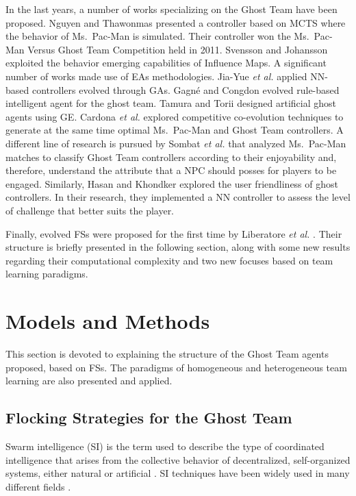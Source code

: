 \documentclass[journal]{IEEEtran}
\begin{document}
In the last years, a number of works specializing on the Ghost Team have been proposed. Nguyen and Thawonmas \cite{Nguyen2011,Nguyen2013} presented a controller based on MCTS where the behavior of Ms.\  Pac-Man is simulated. Their controller won the Ms.\  Pac-Man Versus Ghost Team Competition held in 2011. Svensson and Johansson \cite{Svensson2012} exploited the behavior emerging capabilities of Influence Maps. A significant number of works made use of EAs methodologies. Jia-Yue \emph{et al.} \cite{Jia-Yue11} applied NN-based controllers evolved through GAs. Gagné and Congdon \cite{Gagne2012} evolved rule-based intelligent agent for the ghost team. Tamura and Torii \cite{Tamura2013} designed artificial ghost agents using GE. Cardona \textit{et al.} \cite{Cardona13} explored competitive co-evolution techniques to generate at the same time optimal Ms.\  Pac-Man and Ghost Team controllers. A different line of research is pursued by Sombat \textit{et al.} \cite{Sombat2012} that analyzed Ms.\  Pac-Man matches to classify Ghost Team controllers according to their enjoyability and, therefore, understand the attribute that a NPC should posses for players to be engaged. Similarly, Hasan and Khondker \cite{Hasan2013} explored the user friendliness of ghost controllers. In their research, they implemented a NN controller to assess the level of challenge that better suits the player.

Finally, evolved FSs were proposed for the first time by Liberatore \emph{et al.} \cite{Liberatore2014}.  Their structure is briefly presented in the following section, along with some new results regarding their computational complexity and two new focuses based on team learning paradigms.

\section{Models and Methods}
\label{sec:ModelsMethods}
This section is devoted to explaining the structure of the Ghost Team agents proposed, based on FSs. The paradigms of homogeneous and heterogeneous team learning are also presented and applied. 

\subsection{Flocking Strategies for the Ghost Team}
Swarm intelligence (SI) is the term used to describe the type of coordinated intelligence that arises from the collective behavior of decentralized, self-organized systems, either natural or artificial \cite{BeniWang89}. SI techniques have been widely used in many different fields \cite{Blum2008}.
\end{document}
